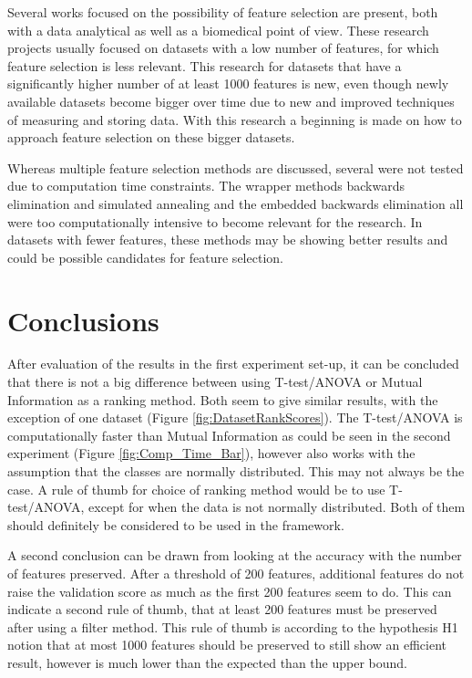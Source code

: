 \documentclass[10pt,a4paper]{report}
\begin{document}
	Several works focused on the possibility of feature selection are present, both with a data analytical\cite{catal2009investigating} as well as a biomedical\cite{baumgartner2006data, welthagen2005comprehensive, liu2002comparative} point of view. These research projects usually focused on datasets with a low number of features, for which feature selection is less relevant. This research for datasets that have a significantly higher number of at least 1000 features is new, even though newly available datasets become bigger over time due to new and improved techniques of measuring and storing data. With this research a beginning is made on how to approach feature selection on these bigger datasets.
	
	Whereas multiple feature selection methods are discussed, several were not tested due to computation time constraints. The wrapper methods backwards elimination and simulated annealing and the embedded backwards elimination all were too computationally intensive to become relevant for the research. In datasets with fewer features, these methods may be showing better results and could be possible candidates for feature selection.
	
	
	\section{Conclusions}	
	\label{FSsec:Conclusions}
	
	After evaluation of the results in the first experiment set-up, it can be concluded that there is not a big difference between using T-test/ANOVA or Mutual Information as a ranking method. Both seem to give similar results, with the exception of one dataset (Figure \ref{fig:DatasetRankScores}). The T-test/ANOVA is computationally faster than Mutual Information as could be seen in the second experiment (Figure \ref{fig:Comp_Time_Bar}), however also works with the assumption that the classes are normally distributed. This may not always be the case. A rule of thumb for choice of ranking method would be to use T-test/ANOVA, except for when the data is not normally distributed. Both of them should definitely be considered to be used in the framework.
	
	A second conclusion can be drawn from looking at the accuracy with the number of features preserved. After a threshold of 200 features, additional features do not raise the validation score as much as the first 200 features seem to do. This can indicate a second rule of thumb, that at least 200 features must be preserved after using a filter method. This rule of thumb is according to the hypothesis H1 notion that at most 1000 features should be preserved to still show an efficient result, however is much lower than the expected than the upper bound.
	
\end{document}
